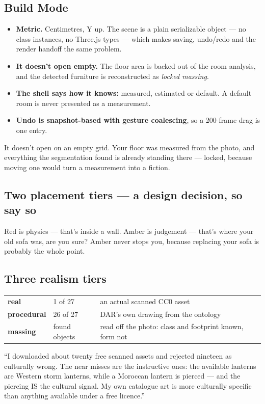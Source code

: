 \documentclass[10.5pt,a4paper]{article}
\begin{document}
\subsection*{Build Mode}
\begin{itemize}[leftmargin=1.1em,itemsep=1pt]
  \item \textbf{Metric.} Centimetres, Y up. The scene is a plain serializable object --- no class
        instances, no Three.js types --- which makes saving, undo/redo and the render handoff the
        same problem.
  \item \textbf{It doesn't open empty.} The floor area is backed out of the room analysis, and the
        detected furniture is reconstructed as \emph{locked massing}.
  \item \textbf{The shell says how it knows:} measured, estimated or default. A default room is
        never presented as a measurement.
  \item \textbf{Undo is snapshot-based with gesture coalescing}, so a 200-frame drag is one entry.
\end{itemize}
\begin{sayit}
It doesn't open on an empty grid. Your floor was measured from the photo, and everything the
segmentation found is already standing there --- locked, because moving one would turn a measurement
into a fiction.
\end{sayit}

\subsection*{Two placement tiers --- a design decision, so say so}
\begin{sayit}
Red is physics --- that's inside a wall. Amber is judgement --- that's where your old sofa was, are
you sure? Amber never stops you, because replacing your sofa is probably the whole point.
\end{sayit}

\subsection*{Three realism tiers}
\begin{tabularx}{\linewidth}{@{}llX@{}}
\toprule
\textbf{real} & 1 of 27 & an actual scanned CC0 asset\\
\textbf{procedural} & 26 of 27 & DAR's own drawing from the ontology\\
\textbf{massing} & found objects & read off the photo: class and footprint known, form not\\
\bottomrule
\end{tabularx}
\begin{strength}
``I downloaded about twenty free scanned assets and rejected nineteen as culturally wrong. The near
misses are the instructive ones: the available lanterns are Western storm lanterns, while a Moroccan
lantern is pierced --- and the piercing IS the cultural signal. My own catalogue art is more
culturally specific than anything available under a free licence.''
\end{strength}
\end{document}
